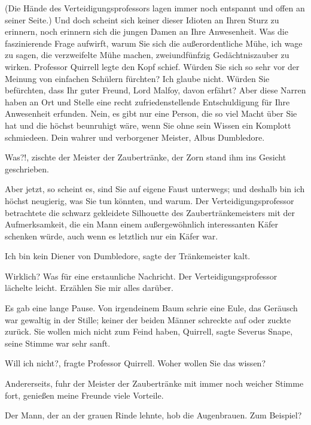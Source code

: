 (Die Hände des Verteidigungsprofessors lagen immer noch entspannt und offen an
seiner Seite.) \glqq{}Und doch scheint sich keiner dieser Idioten an Ihren Sturz
zu erinnern, noch erinnern sich die jungen Damen an Ihre Anwesenheit. Was die
faszinierende Frage aufwirft, warum Sie sich die außerordentliche Mühe, ich wage
zu sagen, die verzweifelte Mühe machen, zweiundfünfzig Gedächtniszauber zu
wirken.\grqq{} Professor Quirrell legte den Kopf schief. \glqq{}Würden Sie sich
so sehr vor der Meinung von einfachen Schülern fürchten? Ich glaube nicht.
Würden Sie befürchten, dass Ihr guter Freund, Lord Malfoy, davon erfährt? Aber
diese Narren haben an Ort und Stelle eine recht zufriedenstellende
Entschuldigung für Ihre Anwesenheit erfunden. Nein, es gibt nur eine Person, die
so viel Macht über Sie hat und die höchst beunruhigt wäre, wenn Sie ohne sein
Wissen ein Komplott schmiedeen. Dein wahrer und verborgener Meister, Albus
Dumbledore.\grqq{}

\glqq{}Was?!\grqq{}, zischte der Meister der Zaubertränke, der Zorn stand ihm ins
Gesicht geschrieben.

\glqq{}Aber jetzt, so scheint es, sind Sie auf eigene Faust unterwegs; und
deshalb bin ich höchst neugierig, was Sie tun könnten, und warum.\grqq{} Der
Verteidigungsprofessor betrachtete die schwarz gekleidete Silhouette des
Zaubertränkemeisters mit der Aufmerksamkeit, die ein Mann einem außergewöhnlich
interessanten Käfer schenken würde, auch wenn es letztlich nur ein Käfer war.

\glqq{}Ich bin kein Diener von Dumbledore\grqq{}, sagte der Tränkemeister kalt.

\glqq{}Wirklich? Was für eine erstaunliche Nachricht.\grqq{} Der
Verteidigungsprofessor lächelte leicht. \glqq{}Erzählen Sie mir alles
darüber.\grqq{}

Es gab eine lange Pause. Von irgendeinem Baum schrie eine Eule, das Geräusch war
gewaltig in der Stille; keiner der beiden Männer schreckte auf oder zuckte
zurück. \glqq{}Sie wollen mich nicht zum Feind haben, Quirrell\grqq{}, sagte
Severus Snape, seine Stimme war sehr sanft.

\glqq{}Will ich nicht?\grqq{}, fragte Professor Quirrell. \glqq{}Woher wollen Sie
das wissen?\grqq{}

\glqq{}Andererseits\grqq{}, fuhr der Meister der Zaubertränke mit immer noch
weicher Stimme fort, \glqq{}genießen meine Freunde viele Vorteile.\grqq{}

Der Mann, der an der grauen Rinde lehnte, hob die Augenbrauen. \glqq{}Zum
Beispiel?\grqq{}

